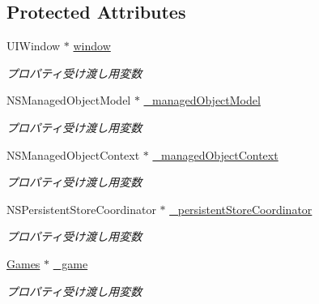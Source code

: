\subsection*{Protected Attributes}
\begin{DoxyCompactItemize}
\item 
\hypertarget{interface_go_clinic_app_delegate_a2cf40ede716686ef1e7a2a7235a04e2b}{
UIWindow $\ast$ \hyperlink{interface_go_clinic_app_delegate_a2cf40ede716686ef1e7a2a7235a04e2b}{window}}
\label{interface_go_clinic_app_delegate_a2cf40ede716686ef1e7a2a7235a04e2b}

\begin{DoxyCompactList}\small\item\em プロパティ受け渡し用変数 \end{DoxyCompactList}\item 
\hypertarget{interface_go_clinic_app_delegate_aced71d74ab745c874711663fb50b093a}{
NSManagedObjectModel $\ast$ \hyperlink{interface_go_clinic_app_delegate_aced71d74ab745c874711663fb50b093a}{\_\-managedObjectModel}}
\label{interface_go_clinic_app_delegate_aced71d74ab745c874711663fb50b093a}

\begin{DoxyCompactList}\small\item\em プロパティ受け渡し用変数 \end{DoxyCompactList}\item 
\hypertarget{interface_go_clinic_app_delegate_a486afb5884da4c99713882ec58192985}{
NSManagedObjectContext $\ast$ \hyperlink{interface_go_clinic_app_delegate_a486afb5884da4c99713882ec58192985}{\_\-managedObjectContext}}
\label{interface_go_clinic_app_delegate_a486afb5884da4c99713882ec58192985}

\begin{DoxyCompactList}\small\item\em プロパティ受け渡し用変数 \end{DoxyCompactList}\item 
\hypertarget{interface_go_clinic_app_delegate_a356b9f708799fad8d71d4df33519f783}{
NSPersistentStoreCoordinator $\ast$ \hyperlink{interface_go_clinic_app_delegate_a356b9f708799fad8d71d4df33519f783}{\_\-persistentStoreCoordinator}}
\label{interface_go_clinic_app_delegate_a356b9f708799fad8d71d4df33519f783}

\begin{DoxyCompactList}\small\item\em プロパティ受け渡し用変数 \end{DoxyCompactList}\item 
\hypertarget{interface_go_clinic_app_delegate_a0c1b7bc380e29b5926cf54790d00ad47}{
\hyperlink{interface_games}{Games} $\ast$ \hyperlink{interface_go_clinic_app_delegate_a0c1b7bc380e29b5926cf54790d00ad47}{\_\-game}}
\label{interface_go_clinic_app_delegate_a0c1b7bc380e29b5926cf54790d00ad47}

\begin{DoxyCompactList}\small\item\em プロパティ受け渡し用変数 \end{DoxyCompactList}\end{DoxyCompactItemize}
